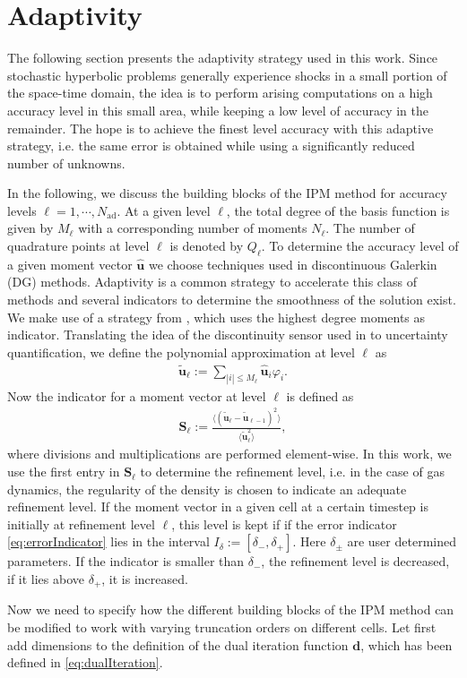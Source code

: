 \section{Adaptivity}
\label{sec:adaptivity}

The following section presents the adaptivity strategy used in this work. Since stochastic hyperbolic problems generally experience shocks in a small portion of the space-time domain, the idea is to perform arising computations on a high accuracy level in this small area, while keeping a low level of accuracy in the remainder. The hope is to achieve the finest level accuracy with this adaptive strategy, i.e. the same error is obtained while using a significantly reduced number of unknowns.

In the following, we discuss the building blocks of the IPM method for accuracy levels $\ell = 1,\cdots,N_{\text{ad}}$. At a given level $\ell$, the total degree of the basis function is given by $M_{\ell}$ with a corresponding number of moments $N_{\ell}$. The number of quadrature points at level $\ell$ is denoted by $Q_{\ell}$. To determine the accuracy level of a given moment vector $\bm{\hat u}$ we choose techniques used in discontinuous Galerkin (DG) methods. Adaptivity is a common strategy to accelerate this class of methods and several indicators to determine the smoothness of the solution exist. We make use of a strategy from \cite{persson2006sub}, which uses the highest degree moments as indicator. Translating the idea of the discontinuity sensor used in \cite{persson2006sub} to uncertainty quantification, we define the polynomial approximation at level $\ell$ as
\begin{align*}
\bm{\tilde u}_{\ell} := \sum_{|i|\leq M_{\ell}} \bm{\hat{u}}_i \varphi_i.
\end{align*}
Now the indicator for a moment vector at level $\ell$ is defined as
\begin{align}\label{eq:errorIndicator}
\bm S_{\ell} := \frac{\langle \left(\bm{\tilde u}_{\ell} - \bm{\tilde u}_{\ell-1}\right)^2\rangle}{\langle \bm{\tilde u}_{\ell}^2\rangle},
\end{align}
where divisions and multiplications are performed element-wise. In this work, we use the first entry in $\bm S_{\ell}$ to determine the refinement level, i.e. in the case of gas dynamics, the regularity of the density is chosen to indicate an adequate refinement level. If the moment vector in a given cell at a certain timestep is initially at refinement level $\ell$, this level is kept if if the error indicator \eqref{eq:errorIndicator} lies in the interval $I_{\delta}:=[\delta_{-},\delta_{+}]$. Here $\delta_{\pm}$ are user determined parameters. If the indicator is smaller than $\delta_-$, the refinement level is decreased, if it lies above $\delta_+$, it is increased.

Now we need to specify how the different building blocks of the IPM method can be modified to work with varying truncation orders on different cells. Let first add dimensions to the definition of the dual iteration function $\bm d$, which has been defined in \eqref{eq:dualIteration}.
